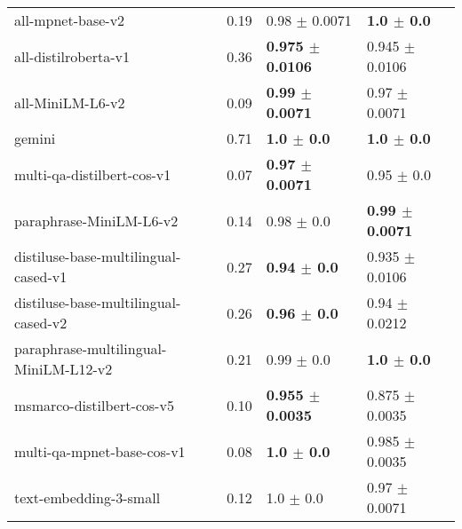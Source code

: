\begin{table*}[t!]
{\begin{tabular}{llll}
                    all-mpnet-base-v2 &                   0.19 &       0.98 $\pm$ 0.0071 &                   \textbf{1.0 $\pm$ 0.0} \\
                 all-distilroberta-v1 &                   0.36 &      \textbf{0.975 $\pm$ 0.0106} &              0.945 $\pm$ 0.0106 \\
                     all-MiniLM-L6-v2 &                   0.09 &       \textbf{0.99 $\pm$ 0.0071} &               0.97 $\pm$ 0.0071 \\
                               gemini &                   0.71 &           \textbf{1.0 $\pm$ 0.0} &                   \textbf{1.0 $\pm$ 0.0} \\
           multi-qa-distilbert-cos-v1 &                   0.07 &       \textbf{0.97 $\pm$ 0.0071} &                  0.95 $\pm$ 0.0 \\
              paraphrase-MiniLM-L6-v2 &                   0.14 &          0.98 $\pm$ 0.0 &               \textbf{0.99 $\pm$ 0.0071} \\
 distiluse-base-multilingual-cased-v1 &                   0.27 &          \textbf{0.94 $\pm$ 0.0} &              0.935 $\pm$ 0.0106 \\
 distiluse-base-multilingual-cased-v2 &                   0.26 &          \textbf{0.96 $\pm$ 0.0} &               0.94 $\pm$ 0.0212 \\
paraphrase-multilingual-MiniLM-L12-v2 &                   0.21 &          0.99 $\pm$ 0.0 &                   \textbf{1.0 $\pm$ 0.0} \\
            msmarco-distilbert-cos-v5 &                   0.10 &      \textbf{0.955 $\pm$ 0.0035} &              0.875 $\pm$ 0.0035 \\
           multi-qa-mpnet-base-cos-v1 &                   0.08 &           \textbf{1.0 $\pm$ 0.0} &              0.985 $\pm$ 0.0035 \\
               text-embedding-3-small &                   0.12 &           1.0 $\pm$ 0.0 &               0.97 $\pm$ 0.0071 \\

\end{tabular}}
\end{table*}
